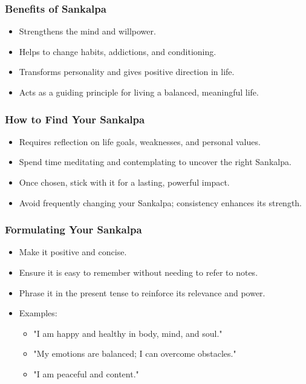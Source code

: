 \begin{frame}[fragile]\frametitle{Benefits of Sankalpa}
    \begin{itemize}
        \item Strengthens the mind and willpower.
        \item Helps to change habits, addictions, and conditioning.
        \item Transforms personality and gives positive direction in life.
        \item Acts as a guiding principle for living a balanced, meaningful life.
    \end{itemize}
\end{frame}

\begin{frame}[fragile]\frametitle{How to Find Your Sankalpa}
    \begin{itemize}
        \item Requires reflection on life goals, weaknesses, and personal values.
        \item Spend time meditating and contemplating to uncover the right Sankalpa.
        \item Once chosen, stick with it for a lasting, powerful impact.
        \item Avoid frequently changing your Sankalpa; consistency enhances its strength.
    \end{itemize}
\end{frame}

\begin{frame}[fragile]\frametitle{Formulating Your Sankalpa}
    \begin{itemize}
        \item Make it positive and concise.
        \item Ensure it is easy to remember without needing to refer to notes.
        \item Phrase it in the present tense to reinforce its relevance and power.
        \item Examples:
        \begin{itemize}
            \item "I am happy and healthy in body, mind, and soul."
            \item "My emotions are balanced; I can overcome obstacles."
            \item "I am peaceful and content."
        \end{itemize}
    \end{itemize}
\end{frame}

